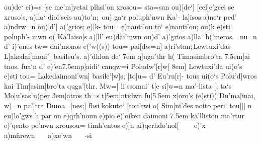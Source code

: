 \documentclass[11pt]{report}
\begin{document}
{\obeylines\everypar{\quad}
ou)de` ei)=s [se me'm]yetai plhsi'on xrosou=
sta=san ou)[de`] [cel]e'gcei se xruso's, a)lla`
dioi'seis au)to'n;\,{\selectfont %
ou) ga`r poluph'nwn Ka'-}\bifida*[.1]
\postlineam{\fontencoding{OT1}\fontfamily{cmr}\fontseries{b}\selectfont
\tiny\,]}%
{\selectfont %
la]isos a)ne`r ped' a)ndrw=n ou)[d'] a('grios;} e)[k-
tou= e)nanti'ou to` e)nanti'on; ou)k e)sti` poluph'-
mwn o( Ka'laiso[s a)]ll' eu)dai'mwn ou)d' a)'grios
a)lla` h('meros.\ {\selectfont %
nu=n d' i)'ones tw= dai'monos}\bifida*[.1]
\postlineam{\fontencoding{OT1}\fontfamily{cmr}\fontseries{b}\selectfont
\tiny\,]}%
e('w{((}s{))} tou= %
{\selectfont pai[dw=n] a)ri'stan;}\,Lewtuxi'das
L]akedai[moni'] basileu's.  a)'dhlon de`
\leavevmode\kern 7em q]uga'thr h( Timasimbro'ta
\leavevmode\kern 7.5em]\punctum ai tnos. {\selectfont %
fua`n d' e)'en}\bifida*[.1]
\leavevmode\kern 7.5em{\selectfont p]aidi` canqw=i Poludw'[r]w[}
\leavevmode\kern 8em] Lewtuxi'da ui(o's e)sti tou= 
Lakedaimoni'wn] basile'[w]s; [to]u= d' Eu'ru[r]-
tous ui(o`s Polu'd]wros kai Tim[asim]bro'ta
quga'[thr. {\selectfont%
Mw=] li'ssomai' t[e si]w=n ma'-\coronis*
lista} [; ta`s Mo]u'sas u(per \punctum\lbrack\kern 3em]\punctum atros
th=s t[\kern 5em]ntidwn fu[\kern 5.5em x]oro's (e)sti{))}
Du'ma[inai, w)=n pa']tra Duma=[nes;]
}
\vspace{5ex}
{\obeylines\everypar{\quad}
fhsi kokuto` [\linea*
tou'twi o( Sim[ni'des
noito peri` tou[\punctum][
\margini[-2.5em]{\Obelus*}\punctum n eu)lo'gws h par\punctum[2]\lbrack
{}on e)qrh'noun e)pio\punctum\lbrack
e)'oiken daimoni\punctum\lbrack
}
\vspace{5ex}
{\obeylines\everypar{\quad}
\leavevmode\kern 7.5em ka'lliston ma'rtur e)'qento po'nwn
xrousou= timh'entos e)\semi]n ai)qer\semi[i; kai sfin a)e'cei
\leavevmode\kern 4em au)tw=n t' eu)rei=an kl\semi]hdo'nol[
}
\vspace{5ex}
\ \ \ %
e)'x\ \ \ %
a)mfirewn\ \ \ %
a)\erasa{}xe'wn\ \ \ %
-si
\end{document}
